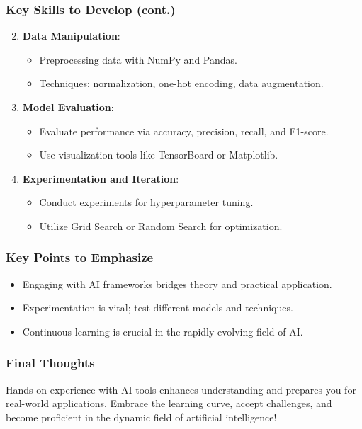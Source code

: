 \documentclass[aspectratio=169]{beamer}
\begin{document}
\begin{frame}
    \frametitle{Key Skills to Develop (cont.)}
    \begin{enumerate}
        \setcounter{enumi}{1} %
        \item \textbf{Data Manipulation}:
        \begin{itemize}
            \item Preprocessing data with NumPy and Pandas.
            \item Techniques: normalization, one-hot encoding, data augmentation.
        \end{itemize}
        
        \item \textbf{Model Evaluation}:
        \begin{itemize}
            \item Evaluate performance via accuracy, precision, recall, and F1-score.
            \item Use visualization tools like TensorBoard or Matplotlib.
        \end{itemize}
        
        \item \textbf{Experimentation and Iteration}:
        \begin{itemize}
            \item Conduct experiments for hyperparameter tuning.
            \item Utilize Grid Search or Random Search for optimization.
        \end{itemize}
    \end{enumerate}
\end{frame}

\begin{frame}
    \frametitle{Key Points to Emphasize}
    \begin{itemize}
        \item Engaging with AI frameworks bridges theory and practical application.
        \item Experimentation is vital; test different models and techniques.
        \item Continuous learning is crucial in the rapidly evolving field of AI.
    \end{itemize}
\end{frame}

\begin{frame}
    \frametitle{Final Thoughts}
    Hands-on experience with AI tools enhances understanding and prepares you for real-world applications. Embrace the learning curve, accept challenges, and become proficient in the dynamic field of artificial intelligence!
\end{frame}
\end{document}
